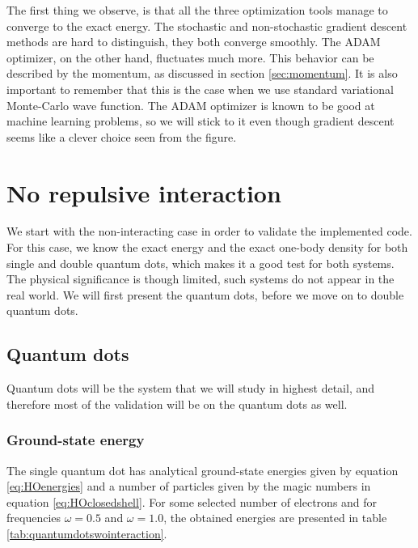 The first thing we observe, is that all the three optimization tools manage to converge to the exact energy. The stochastic and non-stochastic gradient descent methods are hard to distinguish, they both converge smoothly. The ADAM optimizer, on the other hand, fluctuates much more. This behavior can be described by the momentum, as discussed in section \ref{sec:momentum}. It is also important to remember that this is the case when we use standard variational Monte-Carlo wave function. The ADAM optimizer is known to be good at machine learning problems, so we will stick to it even though gradient descent seems like a clever choice seen from the figure. 

\section{No repulsive interaction} \label{sec:norepulsive}
We start with the non-interacting case in order to validate the implemented code. For this case, we know the exact energy and the exact one-body density for both single and double quantum dots, which makes it a good test for both systems. The physical significance is though limited, such systems do not appear in the real world. We will first present the quantum dots, before we move on to double quantum dots. 

\subsection{Quantum dots}
Quantum dots will be the system that we will study in highest detail, and therefore most of the validation will be on the quantum dots as well. 

\subsubsection{Ground-state energy}
The single quantum dot has analytical ground-state energies given by equation \eqref{eq:HOenergies} and a number of particles given by the magic numbers in equation \eqref{eq:HOclosedshell}. For some selected number of electrons and for frequencies $\omega=0.5$ and $\omega=1.0$, the obtained energies are presented in table \eqref{tab:quantumdotswointeraction}.

